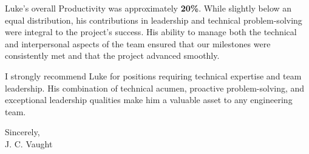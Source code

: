 \documentclass[11pt]{article}
\begin{document}
\begin{flushleft}
Luke’s overall Productivity was approximately \textbf{20\%}. While slightly below an equal distribution, his contributions in leadership and technical problem-solving were integral to the project’s success. His ability to manage both the technical and interpersonal aspects of the team ensured that our milestones were consistently met and that the project advanced smoothly.

I strongly recommend Luke for positions requiring technical expertise and team leadership. His combination of technical acumen, proactive problem-solving, and exceptional leadership qualities make him a valuable asset to any engineering team.

\vspace{12pt}

Sincerely, \\
J. C. Vaught

\end{flushleft}

\newpage
\end{document}
